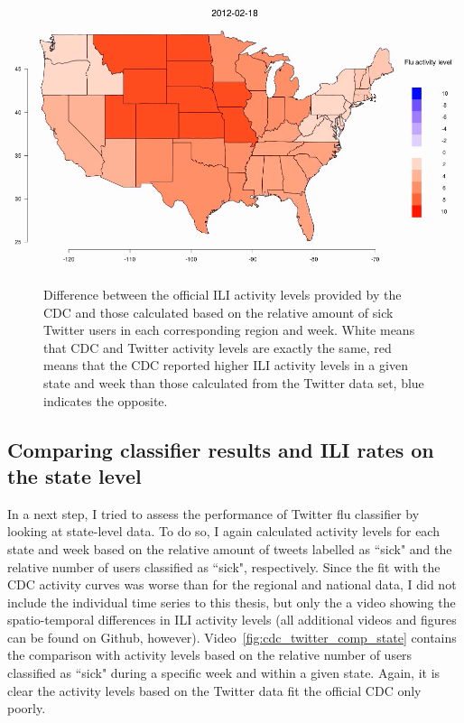 \documentclass[11pt, a4paper,twoside]{report}\usepackage[]{graphicx}\usepackage[]{color}
\begin{document}
\begin{center}
\href{run:vids/3_cdc_twitter_diff_user_regio.avi}{\includegraphics[width=0.9\linewidth]{vids/3_cdc_twitter_diff_user_regio.png}}
\end{center}
\begin{figure}[htbp!]
\centering
  \caption{Difference between the official ILI activity levels provided by the CDC and those calculated based on the relative amount of sick Twitter users in each corresponding region and week. White means that CDC and Twitter activity levels are exactly the same, red means that the CDC reported higher ILI activity levels in a given state and week than those calculated from the Twitter data set, blue indicates the opposite.}
    \label{fig:cdc_twitter_comp_regio}
\end{figure}
\clearpage

\subsection{Comparing classifier results and ILI rates on the state level}
\label{sec:comp_cdc_state}
In a next step, I tried to assess the performance of Twitter flu classifier by looking at state-level data. To do so, I again calculated activity levels for each state and week based on the relative amount of tweets labelled as ``sick" and the relative number of users classified as ``sick", respectively. Since the fit with the CDC activity curves was worse than for the regional and national data, I did not include the individual time series to this thesis, but only the a video showing the spatio-temporal differences in ILI activity levels (all additional videos and figures can be found on Github, however). Video~\ref{fig:cdc_twitter_comp_state} contains the comparison with activity levels based on the relative number of users classified as ``sick" during a specific week and within a given state. Again, it is clear the activity levels based on the Twitter data fit the official CDC only poorly.
\end{document}
